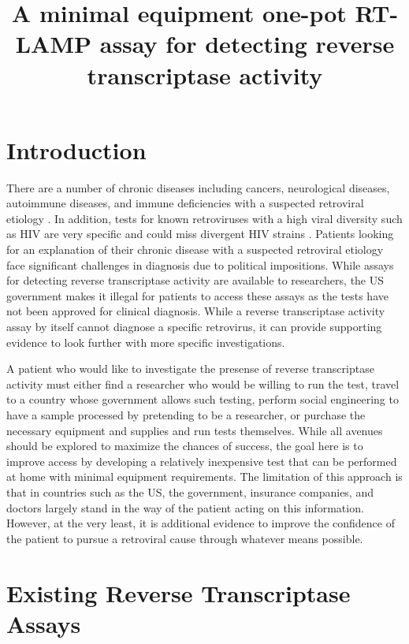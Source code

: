 \documentclass{article}
\title{A minimal equipment one-pot RT-LAMP assay for detecting reverse transcriptase activity}
\begin{document}
\maketitle

\section{Introduction}

There are a number of chronic diseases including cancers, neurological diseases, autoimmune diseases, and immune deficiencies with a suspected retroviral etiology \cite{voisset2008human}. In addition, tests for known retroviruses with a high viral diversity such as HIV are very specific and could miss divergent HIV strains \cite{bartolo2012hiv}\cite{luft2011hiv}. Patients looking for an explanation of their chronic disease with a suspected retroviral etiology face significant challenges in diagnosis due to political impositions. While assays for detecting reverse transcriptase activity are available to researchers, the US government makes it illegal for patients to access these assays as the tests have not been approved for clinical diagnosis. While a reverse transcriptase activity assay by itself cannot diagnose a specific retrovirus, it can provide supporting evidence to look further with more specific investigations.

A patient who would like to investigate the presense of reverse transcriptase activity must either find a researcher who would be willing to run the test, travel to a country whose government allows such testing, perform social engineering to have a sample processed by pretending to be a researcher, or purchase the necessary equipment and supplies and run tests themselves. While all avenues should be explored to maximize the chances of success, the goal here is to improve access by developing a relatively inexpensive test that can be performed at home with minimal equipment requirements. The limitation of this approach is that in countries such as the US, the government, insurance companies, and doctors largely stand in the way of the patient acting on this information. However, at the very least, it is additional evidence to improve the confidence of the patient to pursue a retroviral cause through whatever means possible.

\section{Existing Reverse Transcriptase Assays}
\end{document}
